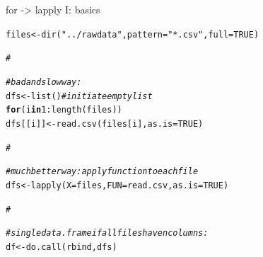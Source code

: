 \documentclass[xcolor=table,           xcolor=dvipsnames]{beamer}\usepackage[]{graphicx}\usepackage[]{color}
\makeatletter
\newcommand{\hlnum}[1]{\textcolor[rgb]{0,0,0}{#1}}
\newcommand{\hlstr}[1]{\textcolor[rgb]{0.545,0.137,0.137}{#1}}
\newcommand{\hlcom}[1]{\textcolor[rgb]{0,0.392,0}{\textit{#1}}}
\newcommand{\hlopt}[1]{\textcolor[rgb]{0,0,0}{#1}}
\newcommand{\hlstd}[1]{\textcolor[rgb]{0,0,0}{#1}}
\newcommand{\hlkwa}[1]{\textcolor[rgb]{1,0,0}{\textbf{#1}}}
\newcommand{\hlkwb}[1]{\textcolor[rgb]{0,0,0}{#1}}
\newcommand{\hlkwc}[1]{\textcolor[rgb]{1,0,1}{#1}}
\newcommand{\hlkwd}[1]{\textcolor[rgb]{0,0,1}{#1}}
\newenvironment{kframe}{%
 \def\at@end@of@kframe{}%
 \ifinner\ifhmode%
  \def\at@end@of@kframe{\end{minipage}}%
  \begin{minipage}{\columnwidth}%
 \fi\fi%
 \def\FrameCommand##1{\hskip\@totalleftmargin \hskip-\fboxsep
 \colorbox{shadecolor}{##1}\hskip-\fboxsep
     \hskip-\linewidth \hskip-\@totalleftmargin \hskip\columnwidth}%
 \MakeFramed {\advance\hsize-\width
   \@totalleftmargin\z@ \linewidth\hsize
   \@setminipage}}%
 {\par\unskip\endMakeFramed%
 \at@end@of@kframe}
\newenvironment{knitrout}{}{} %
\makeatother
\begin{document}
\begin{frame}[fragile]{for -> lapply I: basics}
\vspace{-1em}
\begin{knitrout}
\color{fgcolor}\begin{kframe}
\begin{alltt}
\hlstd{files} \hlkwb{<-} \hlkwd{dir}\hlstd{(}\hlstr{"../rawdata"}\hlstd{,} \hlkwc{pattern}\hlstd{=}\hlstr{"*.csv"}\hlstd{,} \hlkwc{full}\hlstd{=}\hlnum{TRUE}\hlstd{)}

\hlcom{#}
\end{alltt}
\end{kframe}
\end{knitrout}
\pause \vspace{-2.7em}
\begin{knitrout}
\color{fgcolor}\begin{kframe}
\begin{alltt}
\hlcom{# bad and slow way:}
\hlstd{dfs} \hlkwb{<-} \hlkwd{list}\hlstd{()} \hlcom{# initiate empty list}
\hlkwa{for}\hlstd{(i} \hlkwa{in} \hlnum{1}\hlopt{:}\hlkwd{length}\hlstd{(files))}
   \hlstd{dfs[[i]]} \hlkwb{<-} \hlkwd{read.csv}\hlstd{(files[i],} \hlkwc{as.is}\hlstd{=}\hlnum{TRUE}\hlstd{)}

\hlcom{#}
\end{alltt}
\end{kframe}
\end{knitrout}
\pause \vspace{-2.7em}
\begin{knitrout}
\color{fgcolor}\begin{kframe}
\begin{alltt}
\hlcom{# much better way: apply function to each file}
\hlstd{dfs} \hlkwb{<-} \hlkwd{lapply}\hlstd{(}\hlkwc{X}\hlstd{=files,} \hlkwc{FUN}\hlstd{=read.csv,} \hlkwc{as.is}\hlstd{=}\hlnum{TRUE}\hlstd{)}

\hlcom{#}
\end{alltt}
\end{kframe}
\end{knitrout}
\pause \vspace{-2.7em}
\begin{knitrout}
\color{fgcolor}\begin{kframe}
\begin{alltt}
\hlcom{# single data.frame if all files have n columns:}
\hlstd{df} \hlkwb{<-} \hlkwd{do.call}\hlstd{(rbind, dfs)}


\end{alltt}
\end{kframe}
\end{knitrout}
\end{frame}
\end{document}
